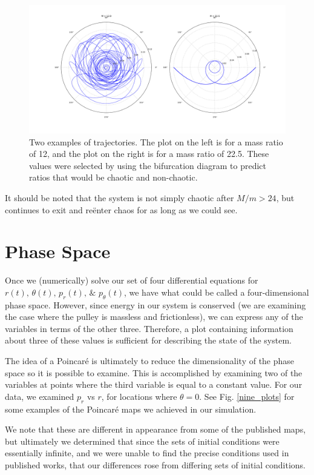 \documentclass{article}
\begin{document}
\begin{figure}
\centering
\includegraphics[width=\textwidth]{two_spots}
\caption{Two examples of trajectories.  The plot on the left is for a mass ratio of 12, and the plot on the right is for a mass ratio of 22.5.  These values were selected by using the bifurcation diagram to predict ratios that would be chaotic and non-chaotic.}
\label{trajectories}
\end{figure}

It should be noted that the system is not simply chaotic after $M/m > 24$, but continues to exit and re\"enter chaos for as long as we could see.

\section*{Phase Space}

Once we (numerically) solve our set of four differential equations for $r(t),\, \theta(t),\, p_{r}(t),\,\& \,\, p_{\theta}(t)$, we have what could be called a four-dimensional phase space.  However, since energy in our system is conserved (we are examining the case where the pulley is massless and frictionless), we can express any of the variables in terms of the other three.  Therefore, a plot containing information about three of these values is sufficient for describing the state of the system.

The idea of a Poincar\'e is ultimately to reduce the dimensionality of the phase space so it is possible to examine.  This is accomplished by examining two of the variables at points where the third variable is equal to a constant value.  For our data, we examined $p_r$ vs $r$, for locations where $\theta = 0$.  See Fig. \ref{nine_plots} for some examples of the Poincar\'e maps we achieved in our simulation.  

We note that these are different in appearance from some of the published maps, but ultimately we determined that since the sets of initial conditions were essentially infinite, and we were unable to find the precise conditions used in published works, that our differences rose from differing sets of initial conditions.
\end{document}
